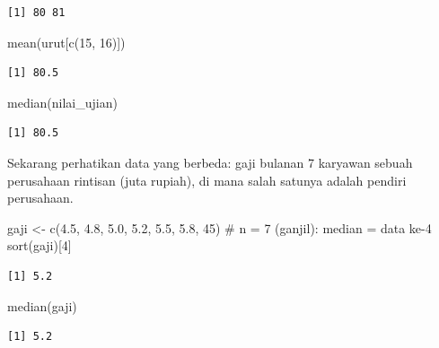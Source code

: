 \documentclass[
  indonesian,
  letterpaper,
]{book}
\newenvironment{Shaded}{\begin{snugshade}}{\end{snugshade}}
\newcommand{\CommentTok}[1]{\textcolor[rgb]{0.37,0.37,0.37}{#1}}
\newcommand{\DecValTok}[1]{\textcolor[rgb]{0.68,0.00,0.00}{#1}}
\newcommand{\FloatTok}[1]{\textcolor[rgb]{0.68,0.00,0.00}{#1}}
\newcommand{\FunctionTok}[1]{\textcolor[rgb]{0.28,0.35,0.67}{#1}}
\newcommand{\NormalTok}[1]{\textcolor[rgb]{0.00,0.23,0.31}{#1}}
\newcommand{\OtherTok}[1]{\textcolor[rgb]{0.00,0.23,0.31}{#1}}
\begin{document}
\begin{verbatim}
[1] 80 81
\end{verbatim}

\begin{Shaded}
\begin{Highlighting}[]
\FunctionTok{mean}\NormalTok{(urut[}\FunctionTok{c}\NormalTok{(}\DecValTok{15}\NormalTok{, }\DecValTok{16}\NormalTok{)])}
\end{Highlighting}
\end{Shaded}

\begin{verbatim}
[1] 80.5
\end{verbatim}

\begin{Shaded}
\begin{Highlighting}[]
\FunctionTok{median}\NormalTok{(nilai\_ujian)}
\end{Highlighting}
\end{Shaded}

\begin{verbatim}
[1] 80.5
\end{verbatim}

Sekarang perhatikan data yang berbeda: gaji bulanan 7 karyawan sebuah
perusahaan rintisan (juta rupiah), di mana salah satunya adalah pendiri
perusahaan.

\begin{Shaded}
\begin{Highlighting}[]
\NormalTok{gaji }\OtherTok{\textless{}{-}} \FunctionTok{c}\NormalTok{(}\FloatTok{4.5}\NormalTok{, }\FloatTok{4.8}\NormalTok{, }\FloatTok{5.0}\NormalTok{, }\FloatTok{5.2}\NormalTok{, }\FloatTok{5.5}\NormalTok{, }\FloatTok{5.8}\NormalTok{, }\DecValTok{45}\NormalTok{)}
\CommentTok{\# n = 7 (ganjil): median = data ke{-}4}
\FunctionTok{sort}\NormalTok{(gaji)[}\DecValTok{4}\NormalTok{]}
\end{Highlighting}
\end{Shaded}

\begin{verbatim}
[1] 5.2
\end{verbatim}

\begin{Shaded}
\begin{Highlighting}[]
\FunctionTok{median}\NormalTok{(gaji)}
\end{Highlighting}
\end{Shaded}

\begin{verbatim}
[1] 5.2
\end{verbatim}
\end{document}
